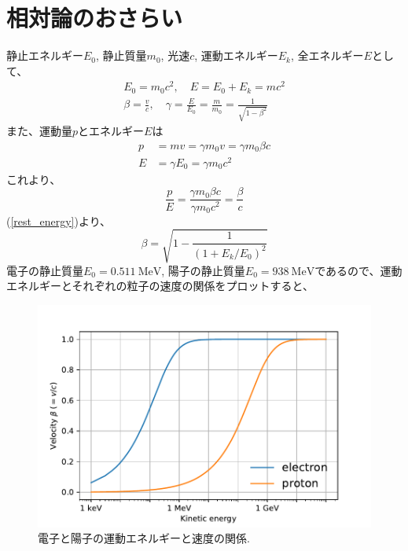 \documentclass[]{jlreq}
\begin{document}
\clearpage

\appendix
\renewcommand{\theequation}{\Alph{section}.\arabic{equation} }
\setcounter{equation}{0}

\section{相対論のおさらい}
静止エネルギー$E_0$, 静止質量$m_0$, 光速$c$, 運動エネルギー$E_k$, 全エネルギー$E$として、
%
\begin{equation}
  \begin{split}
    E_0 = m_0 c^2 ,\quad E = E_0 + E_k = mc^2\\
    \beta =\frac{v}{c}, \quad \gamma = \frac{E}{E_0}=\frac{m}{m_0}=\frac{1}{\sqrt{1-\beta^2}}
    \label{rest_energy}
  \end{split}
\end{equation}
%
また、運動量$p$とエネルギー$E$は
\begin{align}
  p &= mv = \gamma m_0 v = \gamma m_0 \beta c \label{momentum} \\
  E &= \gamma E_0 = \gamma m_0 c^2 \label{energy}
\end{align}
%
これより、
%
\begin{equation}
  \frac{p}{E} = \frac{\gamma m_0 \beta c}{\gamma m_0 c^2} = \frac{\beta}{c}
\end{equation}
%
(\ref{rest_energy})より、
%
\begin{equation}
  \beta = \sqrt{1-\frac{1}{\left(1+ E_k/E_0\right)^2}}
\end{equation}
%
電子の静止質量$E_0 = \SI{0.511}{\mega\electronvolt}$, 陽子の静止質量$E_0 = \SI{938}{\mega\electronvolt}$であるので、運動エネルギーとそれぞれの粒子の速度の関係をプロットすると、

\begin{figure}[hhbt]
  \begin{center}
    \includegraphics[width=12cm,clip]{figs/velocity.pdf}
    \caption{電子と陽子の運動エネルギーと速度の関係.}
    \label{velocity}
  \end{center}
\end{figure}
\end{document}
